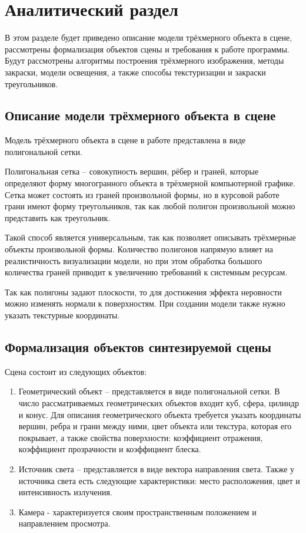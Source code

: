 \chapter{Аналитический раздел}
В этом разделе будет приведено описание модели трёхмерного объекта в сцене,
рассмотрены формализация объектов сцены и требования к работе программы.
Будут рассмотрены алгоритмы построения трёхмерного изображения, методы закраски, модели освещения, а также способы текстуризации и закраски треугольников.

\section{Описание модели трёхмерного объекта в сцене}
Модель трёхмерного объекта в сцене в работе представлена в виде полигональной сетки.

Полигональная сетка -- совокупность вершин, рёбер и граней, которые определяют форму многогранного объекта в трёхмерной компьютерной графике.
Сетка может состоять из граней произвольной формы, но в курсовой работе грани имеют форму треугольников, так как любой полигон 
произвольной можно представить как треугольник.

Такой способ является универсальным, так как позволяет описывать трёхмерные объекты произвольной формы.
Количество полигонов напрямую влияет на реалистичность визуализации модели, но при этом обработка большого количества граней
приводит к увеличению требований к системным ресурсам.

Так как полигоны задают плоскости, то для достижения эффекта неровности можно изменять нормали к поверхностям.
При создании модели также нужно указать текстурные координаты.

\section{Формализация объектов синтезируемой сцены}
Сцена состоит из следующих объектов:
\begin{enumerate}
	\item Геометрический объект -- представляется в виде полигональной сетки. 
	В число рассматриваемых геометрических объектов входит куб, сфера, цилиндр и конус.
	Для описания геометрического объекта требуется указать координаты вершин, ребра и грани между ними,
	цвет объекта или текстура, которая его покрывает, а также свойства поверхности: коэффициент отражения,
	коэффициент прозрачности и коэффициент блеска.
	\item Источник света -- представляется в виде вектора направления света. 
	Также у источника света есть следующие характеристики: место расположения, цвет и интенсивность излучения. 
	\item Камера - характеризуется своим пространственным положением и направлением просмотра.
\end{enumerate}

